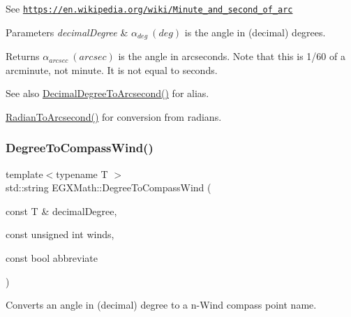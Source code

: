 See \href{https://en.wikipedia.org/wiki/Minute_and_second_of_arc}{\tt https\+://en.\+wikipedia.\+org/wiki/\+Minute\+\_\+and\+\_\+second\+\_\+of\+\_\+arc} 
\begin{DoxyParams}{Parameters}
{\em decimal\+Degree} & $\alpha_{deg}\ (deg)$ is the angle in (decimal) degrees. \\
\hline
\end{DoxyParams}
\begin{DoxyReturn}{Returns}
$\alpha_{arcsec}\ (arcsec)$ is the angle in arcseconds. Note that this is 1/60 of a arcminute, not minute. It is not equal to seconds. 
\end{DoxyReturn}
\begin{DoxySeeAlso}{See also}
\mbox{\hyperlink{group___e_g_x_math-_angle_conversions-_decimal_degree_gab9d5635a6e35127b5245978aba508962}{Decimal\+Degree\+To\+Arcsecond()}} for alias. 

\mbox{\hyperlink{group___e_g_x_math-_angle_conversions-_radian_ga2f952f6675a0fc54bf72bfe4e3d2664a}{Radian\+To\+Arcsecond()}} for conversion from radians. 
\end{DoxySeeAlso}
\mbox{\label{group___e_g_x_math-_angle_conversions-_degree_ga5ffef873bcec300ab90570ad6e7b1ab1}} 
\subsubsection{\texorpdfstring{Degree\+To\+Compass\+Wind()}{DegreeToCompassWind()}}
{\footnotesize\ttfamily template$<$typename T $>$ \\
std\+::string E\+G\+X\+Math\+::\+Degree\+To\+Compass\+Wind (\begin{DoxyParamCaption}\item[{const T \&}]{decimal\+Degree,  }\item[{const unsigned int}]{winds,  }\item[{const bool}]{abbreviate }\end{DoxyParamCaption})}



Converts an angle in (decimal) degree to a n-\/\+Wind compass point name. 

